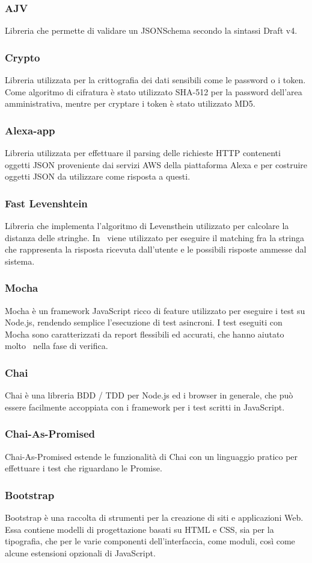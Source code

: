 \documentclass[../ManualeSviluppatore_v2.0.0.tex]{subfiles}
\begin{document}
		\subsubsection{AJV}
			Libreria che permette di validare un JSONSchema secondo la sintassi Draft v4.
		\subsubsection{Crypto}
			Libreria utilizzata per la crittografia dei dati sensibili come le password o i token. Come algoritmo di cifratura è stato utilizzato SHA-512 per la password dell'area amministrativa, mentre per cryptare i token è stato utilizzato MD5.
		\subsubsection{Alexa-app}
			Libreria utilizzata per effettuare il \gls{parsing} delle richieste HTTP contenenti oggetti JSON proveniente dai servizi AWS della piattaforma Alexa e per costruire oggetti JSON da utilizzare come risposta a questi.
		\subsubsection{Fast Levenshtein}
			Libreria che implementa l'algoritmo di Levensthein utilizzato per calcolare la distanza delle stringhe. In \atavi\ viene utilizzato per eseguire il \gls{matching} fra la stringa che rappresenta la risposta ricevuta dall'utente e le possibili risposte ammesse dal sistema.
		\subsubsection{Mocha}
			Mocha è un framework JavaScript ricco di feature utilizzato per eseguire i test su Node.js, rendendo semplice l'esecuzione di test asincroni. I test eseguiti con Mocha sono caratterizzati da \gls{report} flessibili ed accurati, che hanno aiutato molto \kpanic\ nella fase di verifica.
		\subsubsection{Chai}
			Chai è una libreria BDD / TDD per Node.js ed i browser in generale, che può essere facilmente accoppiata con i framework per i test scritti in JavaScript.
		\subsubsection{Chai-As-Promised}
			Chai-As-Promised estende le funzionalità di Chai con un linguaggio pratico per effettuare i test che riguardano le \gls{Promise}.
		\subsubsection{Bootstrap}
			Bootstrap è una raccolta di strumenti per la creazione di siti e applicazioni Web. Essa contiene modelli di progettazione basati su HTML e CSS, sia per la tipografia, che per le varie componenti dell'interfaccia, come moduli, così come alcune estensioni opzionali di JavaScript.
\end{document}

